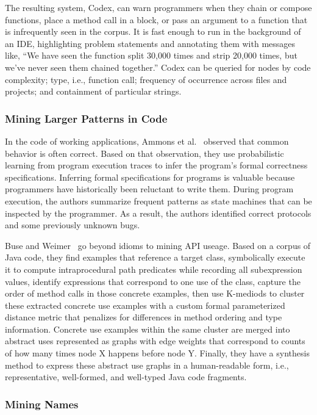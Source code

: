 The resulting system, Codex, can warn programmers when they chain or compose functions, place a method call in a block, or pass an argument to a function that is infrequently seen in the corpus. It is fast enough to run in the background of an IDE, highlighting problem statements and annotating them with messages like, ``We have seen the function split 30,000 times and strip 20,000 times, but we've never seen them chained together.'' Codex can be queried for nodes by code complexity; type, i.e., function call; frequency of occurrence across files and projects; and containment of particular strings.

\subsubsection{Mining Larger Patterns in Code}

In the code of working applications, Ammons et al.~\cite{ammons2002mining} observed that common behavior is often correct. Based on that observation, they use probabilistic learning from program execution traces to infer the program’s formal correctness specifications. Inferring formal specifications for programs is valuable because programmers have historically been reluctant to write them. During program execution, the authors summarize frequent patterns as state machines that can be inspected by the programmer. As a result, the authors identified correct protocols and some previously unknown bugs.

Buse and Weimer~\cite{buse2012synthesizing} go beyond idioms to mining API useage. Based on a corpus of Java code, they find examples that reference a target class, symbolically execute it to compute intraprocedural path predicates while recording all subexpression values, identify expressions that correspond to one use of the class, capture the order of method calls in those concrete examples, then use K-mediods to cluster these extracted concrete use examples with a custom formal parameterized distance metric that penalizes for differences in method ordering and type information. Concrete use examples within the same cluster are merged into abstract uses represented as graphs with edge weights that correspond to counts of how many times node X happens before node Y. Finally, they have a synthesis method to express these abstract use graphs in a human-readable form, i.e., representative, well-formed, and well-typed Java code fragments.

\subsubsection{Mining Names}

